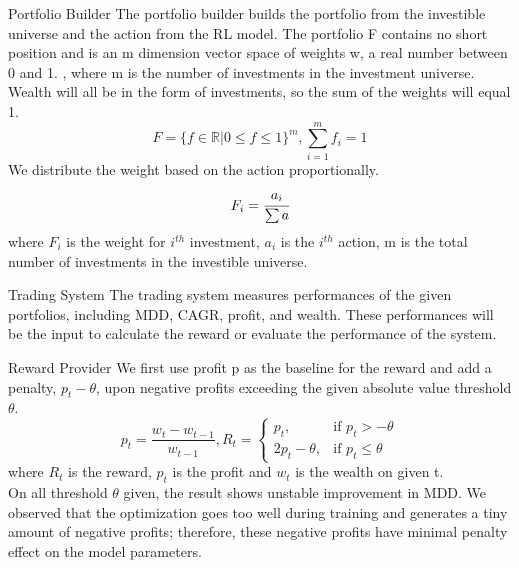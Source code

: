 \begin{frame}{Portfolio Builder}
The portfolio builder builds the portfolio from the investible universe and the action from the RL model.
The portfolio F contains no short position and is an m dimension vector space of weights w, a real number between 0 and 1. , where m is the number of investments in the investment universe. Wealth will all be in the form of investments, so the sum of the weights will equal 1.
\[
    F = \{ {f \in \mathbb{R} | 0 \leq f \leq 1 } \} ^m,
    \sum_{i=1}^m {f_i} =1
\]
We distribute the weight based on the action proportionally.
\[
    F_i = \cfrac{a_i}{\sum a} 
\]
where \(F_i\) is the weight for \(i^{th}\) investment, \(a_i\) is the  \(i^{th}\) action, m is the total number of investments in the investible universe. 

\end{frame}


\begin{frame}{Trading System}
The trading system measures performances of the given portfolios, including MDD, CAGR, profit, and wealth. These performances will be the input to calculate the reward or evaluate the performance of the system. 
    
\end{frame}

\begin{frame}{Reward Provider}
We first use profit p as the baseline for the reward and add a penalty, \(p_t-\theta\), upon negative profits exceeding the given absolute value threshold \(\theta\). 
\[
p_t = \frac{w_t-w_{t-1}}{w_{t-1}}
, 
R_t = 
\begin{cases}
    p_t,&\text{if  }p_t > -\theta\\
    2p_t - \theta ,&\text{if  }p_t \leq  \theta
\end{cases}
\]
where \(R_t\) is the reward, \(p_t\) is the profit and \(w_t\) is the wealth on given t.
\\
On all threshold \(\theta\) given, the result shows unstable improvement in MDD. We observed that the optimization goes too well during training and generates a tiny amount of negative profits; therefore, these negative profits have minimal penalty effect on the model parameters.
\\

\end{frame}

